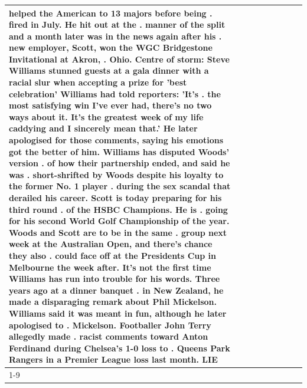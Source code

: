 \begin{table}[H]
\begin{tabular}{lllrlllll}
helped the American to 13 majors before being . fired in July. He hit out at the . manner of the split and a month later was in the news again after his . new employer, Scott, won the WGC Bridgestone Invitational at Akron, . Ohio. Centre of storm: Steve Williams stunned guests at a gala dinner with a racial slur when accepting a prize for 'best celebration' Williams had told reporters: 'It's . the most satisfying win I've ever had, there's no two ways about it. It's the greatest week of my life caddying and I sincerely mean that.' He later apologised for those comments, saying his emotions got the better of him. Williams has disputed Woods' version . of how their partnership ended, and said he was . short-shrifted by Woods despite his loyalty to the former No. 1 player . during the sex scandal that derailed his career. Scott is today preparing for his third round . of the HSBC Champions. He is . going for his second World Golf Championship of the year. Woods and Scott are to be in the same . group next week at the Australian Open, and there's chance they also . could face off at the Presidents Cup in Melbourne the week after. It's not the first time Williams has run into trouble for his words. Three years ago at a dinner banquet . in New Zealand, he made a disparaging remark about Phil Mickelson. Williams said it was meant in fun, although he later apologised to . Mickelson. Footballer John Terry allegedly made . racist comments toward Anton Ferdinand during Chelsea's 1-0 loss to . Queens Park Rangers in a Premier League loss last month. LIE \\
\cline{1-9}

\end{tabular}
\end{table}
